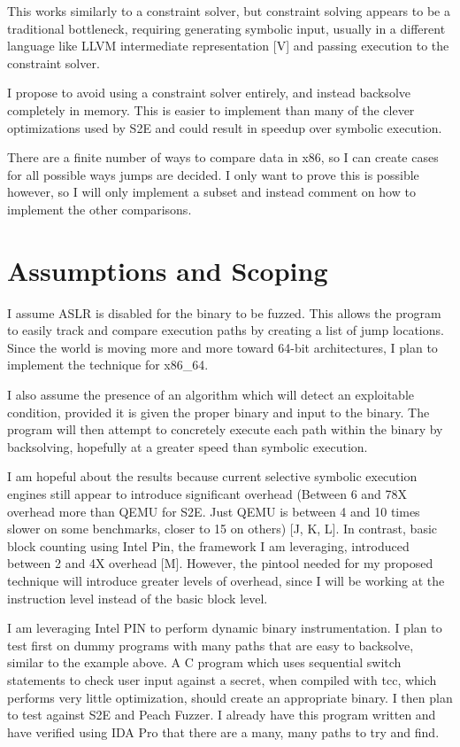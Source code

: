 \documentclass[10pt, twocolumn, times, nocopyrightspace, preprint]{sigplanconf}
\begin{document}
This works similarly to a constraint solver, but constraint solving appears to be a traditional bottleneck, requiring generating symbolic input, usually in a different language like LLVM intermediate representation [V] and passing execution to the constraint solver.

I propose to avoid using a constraint solver entirely, and instead backsolve completely in memory. This is easier to implement than many of the clever optimizations used by S2E and could result in speedup over symbolic execution.


There are a finite number of ways to compare data in x86, so I can create cases for all possible ways jumps are decided. I only want to prove this is possible however, so I will only implement a subset and instead comment on how to implement the other comparisons.

\section{Assumptions and Scoping}

I assume ASLR is disabled for the binary to be fuzzed. This allows the program to easily track and compare execution paths by creating a list of jump locations. Since the world is moving more and more toward 64-bit architectures, I plan to implement the technique for x86\_64.

I also assume the presence of an algorithm which will detect an exploitable condition, provided it is given the proper binary and input to the binary. The program will then attempt to concretely execute each path within the binary by backsolving, hopefully at a greater speed than symbolic execution. 

I am hopeful about the results because current selective symbolic execution engines still appear to introduce significant overhead (Between 6 and 78X overhead more than QEMU for S2E. Just QEMU is between 4 and 10 times slower on some benchmarks, closer to 15 on others) [J, K, L]. In contrast, basic block counting using Intel Pin, the framework I am leveraging, introduced between 2 and 4X overhead [M]. However, the pintool needed for my proposed technique will introduce greater levels of overhead, since I will be working at the instruction level instead of the basic block level.

I am leveraging Intel PIN to perform dynamic binary instrumentation. I plan to test first on dummy programs with many paths that are easy to backsolve, similar to the example above. A C program which uses sequential switch statements to check user input against a secret, when compiled with tcc, which performs very little optimization, should create an appropriate binary. I then plan to test against S2E and Peach Fuzzer. I already have this program written and have verified using IDA Pro that there are a many, many paths to try and find.
\end{document}
